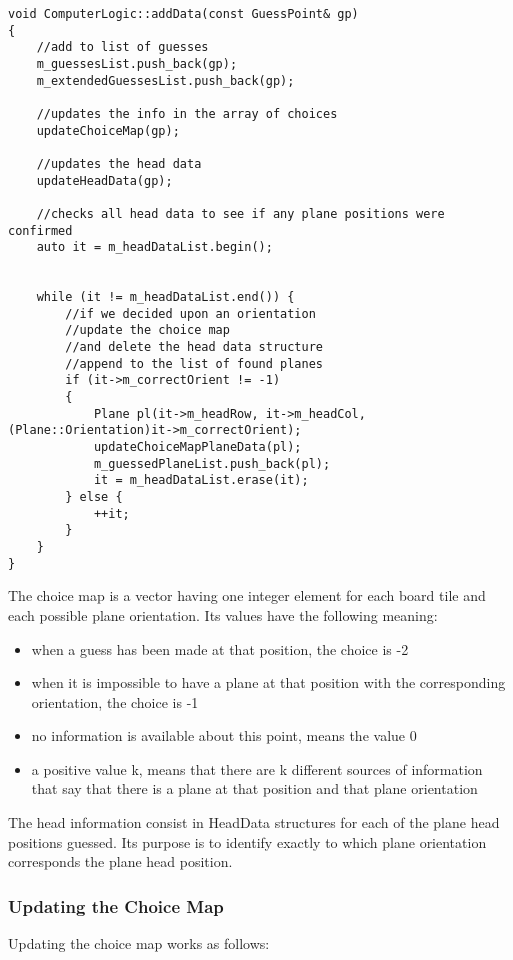 \begin{lstlisting}
void ComputerLogic::addData(const GuessPoint& gp)
{
	//add to list of guesses
	m_guessesList.push_back(gp);
	m_extendedGuessesList.push_back(gp);
	
	//updates the info in the array of choices
	updateChoiceMap(gp);
	
	//updates the head data
	updateHeadData(gp);
	
	//checks all head data to see if any plane positions were confirmed
	auto it = m_headDataList.begin();
	
	
	while (it != m_headDataList.end()) {
		//if we decided upon an orientation
		//update the choice map
		//and delete the head data structure
		//append to the list of found planes
		if (it->m_correctOrient != -1)
		{
			Plane pl(it->m_headRow, it->m_headCol, (Plane::Orientation)it->m_correctOrient);
			updateChoiceMapPlaneData(pl);
			m_guessedPlaneList.push_back(pl);
			it = m_headDataList.erase(it);
		} else {
			++it;
		}
	}
}
\end{lstlisting}

The choice map is a vector having one integer element for each board tile and each possible plane orientation. Its values have the following meaning:

\begin{itemize}
	\item when a guess has been made at that position, the choice is -2
	\item when it is impossible to have a plane at that position with the corresponding orientation, the choice is -1
	\item no information is available about this point, means the value 0
	\item a positive value k, means that there are k different sources of information that say that there is a plane at that position and that plane orientation
\end{itemize}

The head information consist in HeadData structures for each of the plane head positions guessed. Its purpose is to identify exactly to which plane orientation corresponds the plane head position.

\subsubsection{Updating the Choice Map}

Updating the choice map works as follows:

